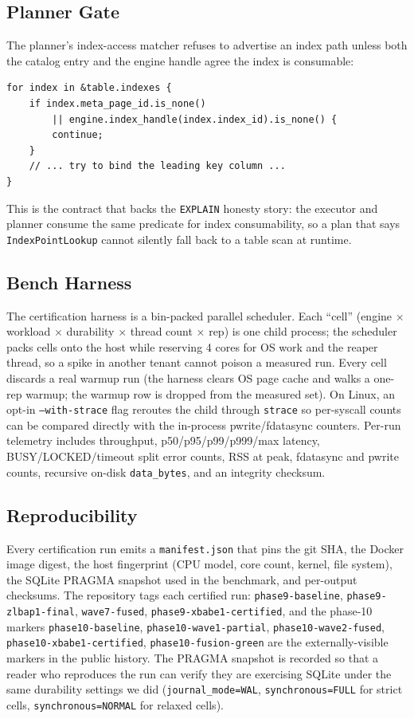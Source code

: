 \subsection{Planner Gate}
The planner's index-access matcher refuses to advertise an index path
unless both the catalog entry and the engine handle agree the index
is consumable:

\begin{lstlisting}
for index in &table.indexes {
    if index.meta_page_id.is_none()
        || engine.index_handle(index.index_id).is_none() {
        continue;
    }
    // ... try to bind the leading key column ...
}
\end{lstlisting}

This is the contract that backs the \texttt{EXPLAIN} honesty story:
the executor and planner consume the same predicate for index
consumability, so a plan that says \texttt{IndexPointLookup} cannot
silently fall back to a table scan at runtime.

\subsection{Bench Harness}
The certification harness is a bin-packed parallel scheduler. Each
``cell'' (engine $\times$ workload $\times$ durability $\times$ thread
count $\times$ rep) is one child process; the scheduler packs cells
onto the host while reserving 4 cores for OS work and the reaper
thread, so a spike in another tenant cannot poison a measured run.
Every cell discards a real warmup run (the harness clears OS page
cache and walks a one-rep warmup; the warmup row is dropped from the
measured set). On Linux, an opt-in \texttt{--with-strace} flag
reroutes the child through \texttt{strace} so per-syscall counts can
be compared directly with the in-process pwrite/fdatasync counters.
Per-run telemetry includes throughput, p50/p95/p99/p999/max latency,
BUSY/LOCKED/timeout split error counts, RSS at peak,
fdatasync and pwrite counts, recursive on-disk \texttt{data\_bytes},
and an integrity checksum.

\subsection{Reproducibility}
Every certification run emits a \texttt{manifest.json} that pins the
git SHA, the Docker image digest, the host fingerprint (CPU model,
core count, kernel, file system), the SQLite PRAGMA snapshot used in
the benchmark, and per-output checksums. The repository tags each
certified run: \texttt{phase9-baseline}, \texttt{phase9-zlbap1-final},
\texttt{wave7-fused}, \texttt{phase9-xbabe1-certified}, and the
phase-10 markers \texttt{phase10-baseline},
\texttt{phase10-wave1-partial}, \texttt{phase10-wave2-fused},
\texttt{phase10-xbabe1-certified}, \texttt{phase10-fusion-green} are
the externally-visible markers in the public history. The PRAGMA
snapshot is recorded so that a reader who reproduces the run can
verify they are exercising SQLite under the same durability settings
we did (\texttt{journal\_mode=WAL}, \texttt{synchronous=FULL} for
strict cells, \texttt{synchronous=NORMAL} for relaxed cells).

